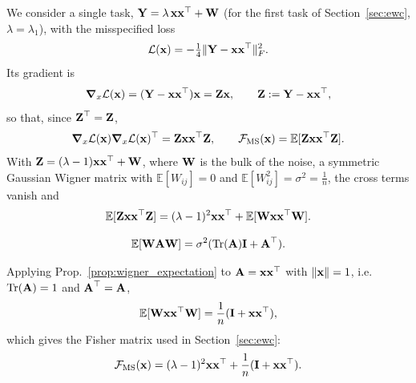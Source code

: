 We consider a single task, $\vect Y = \lambda\,\vect x\vect x^\top + \vect W$ (for the first task of Section~\ref{sec:ewc}, $\lambda = \lambda_1$), with the misspecified loss
\[
    \mathcal{L}(\vect{x}) = -\tfrac{1}{4} \|\vect Y - \vect{x}\vect{x}^\top\|_F^2 .
\]
Its gradient is
\[
    \vect \nabla_x \mathcal{L}(\vect{x}) = (\vect Y - \vect{x} \vect{x}^\top) \vect{x} = \vect Z\vect{x},
    \qquad \vect Z := \vect Y - \vect{x} \vect{x}^\top ,
\]
so that, since $\vect Z^\top = \vect Z$,
\[
    \vect \nabla_x \mathcal{L}(\vect{x}) \vect \nabla_x \mathcal{L}(\vect{x})^\top = \vect Z \vect{x}\vect{x}^\top \vect Z ,
    \qquad
    \mathcal{F}_{\mathrm{MS}}(\vect{x}) = \mathbb{E}[\vect Z \vect{x}\vect{x}^\top \vect Z] .
\]
With $\vect Z = (\lambda - 1) \vect{x} \vect{x}^\top + \vect W$, where $\vect W$ is the bulk of the noise, a symmetric Gaussian Wigner matrix with $\mathbb{E}[W_{ij}]=0$ and $\mathbb{E}[W_{ij}^2]=\sigma^2=\frac{1}{n}$, the cross terms vanish and
\[
\mathbb{E} [\vect Z \vect{x} \vect{x}^\top \vect Z] = (\lambda - 1)^2 \vect{x} \vect{x}^\top + \mathbb{E}[\vect W \vect{x} \vect{x}^\top \vect W] .
\]
\begin{property} \label{prop:wigner_expectation}
\[
    \mathbb{E}[\vect W \vect A \vect W] = \sigma^2(\mathrm{Tr}(\vect A) \vect I + \vect A^\top).
\]
\end{property}
\noindent
Applying Prop.~\ref{prop:wigner_expectation} to $\vect A = \vect{x} \vect{x}^\top$ with $\|\vect{x}\| = 1$, i.e.\ $\mathrm{Tr}(\vect A) = 1$ and $\vect A^\top = \vect A$,
\[
\mathbb{E}[\vect W \vect{x} \vect{x}^\top \vect W] = \frac{1}{n}(\vect I + \vect{x} \vect{x}^\top),
\]
which gives the Fisher matrix used in Section~\ref{sec:ewc}:
\begin{equation}
    \mathcal{F}_{\mathrm{MS}}(\vect{x}) = (\lambda-1)^2\vect{x}\vect{x}^\top + \frac{1}{n}(\vect I + \vect{x} \vect{x}^\top) .
    \label{eq:fisher_ms}
\end{equation}


